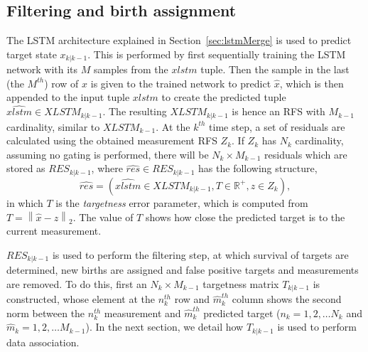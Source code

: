 \documentclass[runningheads]{llncs}
\begin{document}
\subsection{Filtering and birth assignment}
The LSTM architecture explained in Section~\ref{sec:lstmMerge} is used to predict target state $x_{k|k-1}$. This is performed by first sequentially training the LSTM network with its $M$ samples from the $xlstm$ tuple. Then the sample in the last (the $M^{th}$) row of $x$ is given to the trained network to predict $\hat{x}$, which is then appended to the input tuple $xlstm$ to create the predicted tuple $\hat{xlstm} \in XLSTM_{k|k-1}$. The resulting $XLSTM_{k|k-1}$ is hence an RFS with $M_{k-1}$ cardinality, similar to $XLSTM_{k-1}$. 
At the $k^{th}$ time step, a set of residuals are calculated using the obtained measurement RFS $Z_k$. If $Z_k$ has $N_k$ cardinality, assuming no gating is performed, there will be $N_k \times M_{k-1}$ residuals which are stored as $RES_{k|k-1}$, where $\hat{res} \in RES_{k|k-1}$ has the following structure,
\begin{equation}
\hat{res} = \left(\hat{xlstm} \in XLSTM_{k|k-1}, T \in \mathbb{R^{+}}, z \in Z_k\right),
\label{eq:myres}
\end{equation}
\noindent in which $T$ is the \emph{targetness} error parameter, which is computed from $T = \left\lVert \hat{x} - z \right\rVert_{2}$. The value of $T$ shows how close the predicted target is to the current measurement. 

\noindent $RES_{k|k-1}$ is used to perform the filtering step, at which survival of targets are determined, new births are assigned and false positive targets and measurements are removed.
To do this, first an $N_k \times M_{k-1}$ targetness matrix $T_{k|k-1}$ is constructed, whose element at the $n_k^{th}$ row and $\hat{m}_k^{th}$ column shows the second norm between the $n_k^{th}$ measurement and $\hat{m}_k^{th}$ predicted target ($n_k = 1, 2, \ldots N_k$ and $\hat{m}_k = 1, 2, \ldots M_{k-1}$). In the next section, we detail how $T_{k|k-1}$ is used to perform data association.
\end{document}
